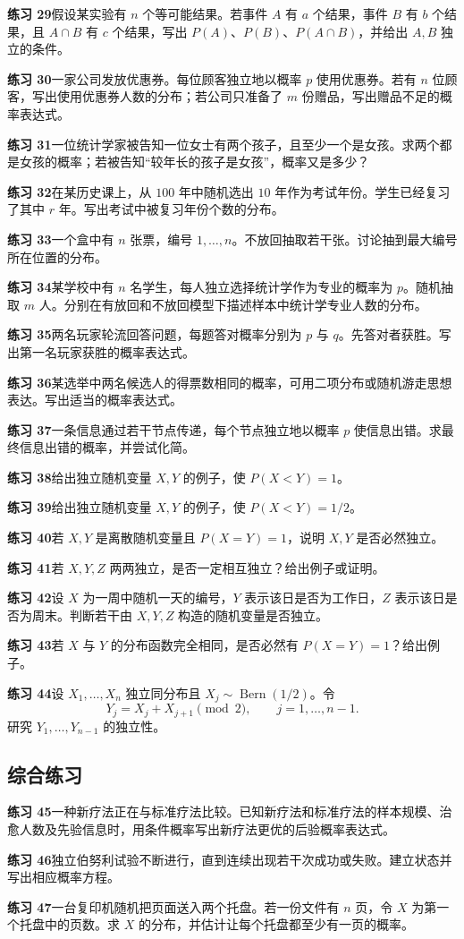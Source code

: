 \documentclass[UTF8,12pt,a4paper,fontset=fandol]{ctexart}
\begin{document}
\noindent\textbf{练习 29}\quad 假设某实验有 $n$ 个等可能结果。若事件 $A$ 有 $a$ 个结果，事件 $B$ 有 $b$ 个结果，且 $A\cap B$ 有 $c$ 个结果，写出 $P(A)$、$P(B)$、$P(A\cap B)$，并给出 $A,B$ 独立的条件。

\noindent\textbf{练习 30}\quad 一家公司发放优惠券。每位顾客独立地以概率 $p$ 使用优惠券。若有 $n$ 位顾客，写出使用优惠券人数的分布；若公司只准备了 $m$ 份赠品，写出赠品不足的概率表达式。

\noindent\textbf{练习 31}\quad 一位统计学家被告知一位女士有两个孩子，且至少一个是女孩。求两个都是女孩的概率；若被告知“较年长的孩子是女孩”，概率又是多少？

\noindent\textbf{练习 32}\quad 在某历史课上，从 $100$ 年中随机选出 $10$ 年作为考试年份。学生已经复习了其中 $r$ 年。写出考试中被复习年份个数的分布。

\noindent\textbf{练习 33}\quad 一个盒中有 $n$ 张票，编号 $1,\ldots,n$。不放回抽取若干张。讨论抽到最大编号所在位置的分布。

\noindent\textbf{练习 34}\quad 某学校中有 $n$ 名学生，每人独立选择统计学作为专业的概率为 $p$。随机抽取 $m$ 人。分别在有放回和不放回模型下描述样本中统计学专业人数的分布。

\noindent\textbf{练习 35}\quad 两名玩家轮流回答问题，每题答对概率分别为 $p$ 与 $q$。先答对者获胜。写出第一名玩家获胜的概率表达式。

\noindent\textbf{练习 36}\quad 某选举中两名候选人的得票数相同的概率，可用二项分布或随机游走思想表达。写出适当的概率表达式。

\noindent\textbf{练习 37}\quad 一条信息通过若干节点传递，每个节点独立地以概率 $p$ 使信息出错。求最终信息出错的概率，并尝试化简。

\noindent\textbf{练习 38}\quad 给出独立随机变量 $X,Y$ 的例子，使 $P(X<Y)=1$。

\noindent\textbf{练习 39}\quad 给出独立随机变量 $X,Y$ 的例子，使 $P(X<Y)=1/2$。

\noindent\textbf{练习 40}\quad 若 $X,Y$ 是离散随机变量且 $P(X=Y)=1$，说明 $X,Y$ 是否必然独立。

\noindent\textbf{练习 41}\quad 若 $X,Y,Z$ 两两独立，是否一定相互独立？给出例子或证明。

\noindent\textbf{练习 42}\quad 设 $X$ 为一周中随机一天的编号，$Y$ 表示该日是否为工作日，$Z$ 表示该日是否为周末。判断若干由 $X,Y,Z$ 构造的随机变量是否独立。

\noindent\textbf{练习 43}\quad 若 $X$ 与 $Y$ 的分布函数完全相同，是否必然有 $P(X=Y)=1$？给出例子。

\noindent\textbf{练习 44}\quad 设 $X_1,\ldots,X_n$ 独立同分布且 $X_j\sim\operatorname{Bern}(1/2)$。令
\[
  Y_j=X_j+X_{j+1}\pmod 2,\qquad j=1,\ldots,n-1.
\]
研究 $Y_1,\ldots,Y_{n-1}$ 的独立性。

\subsection*{综合练习}

\noindent\textbf{练习 45}\quad 一种新疗法正在与标准疗法比较。已知新疗法和标准疗法的样本规模、治愈人数及先验信息时，用条件概率写出新疗法更优的后验概率表达式。

\noindent\textbf{练习 46}\quad 独立伯努利试验不断进行，直到连续出现若干次成功或失败。建立状态并写出相应概率方程。

\noindent\textbf{练习 47}\quad 一台复印机随机把页面送入两个托盘。若一份文件有 $n$ 页，令 $X$ 为第一个托盘中的页数。求 $X$ 的分布，并估计让每个托盘都至少有一页的概率。
\end{document}
